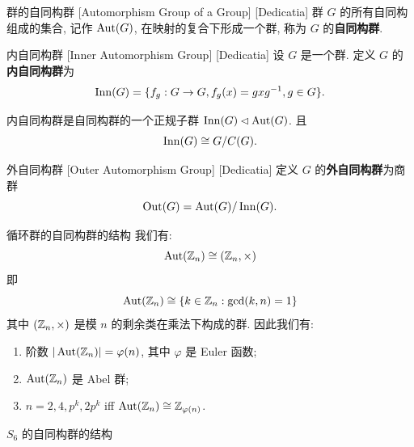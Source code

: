         \begin{dfn}
            [GroupAutomorphism]
            {群的自同构群}
            [Automorphism Group of a Group]
            [Dedicatia]
            群 \(G\) 的所有自同构组成的集合, 记作 \(\operatorname{Aut}(G)\), 在映射的复合下形成一个群, 称为 \(G\) 的\textbf{自同构群}.
        \end{dfn}

        \begin{dfn}
            [InnerAutomorphismGroup]
            {内自同构群}
            [Inner Automorphism Group]
            [Dedicatia]
            设 \(G\) 是一个群. 定义 \(G\) 的\textbf{内自同构群}为
            \[\operatorname{Inn}(G)=\{f_g: G\to G, f_g(x)=gxg^{-1}, g\in G\}.\]
        \end{dfn}

        \begin{ppt}
            {内自同构群是自同构群的一个正规子群}
            \(\operatorname{Inn}(G)\lhd\operatorname{Aut}(G)\). 且
            \[\operatorname{Inn}(G)\cong G/C(G). \]
        \end{ppt}

        \begin{dfn}
            [OuterAutomorphismGroup]
            {外自同构群}
            [Outer Automorphism Group]
            [Dedicatia]
            定义 \(G\) 的\textbf{外自同构群}为商群
            \[\operatorname{Out}(G)=\operatorname{Aut}(G)/\operatorname{Inn}(G).\]
        \end{dfn}

        \begin{xmp}
            {循环群的自同构群的结构}
            我们有:
            \[\operatorname{Aut}(\operatorname{\mathbb{Z}}_n)\cong(\operatorname{\mathbb{Z}}_n, \times)\]
            即
            \[\operatorname{Aut}(\operatorname{\mathbb{Z}}_n)\cong\{k\in\operatorname{\mathbb{Z}}_n: \gcd(k,n)=1\}\]
            其中 \((\operatorname{\mathbb{Z}}_n, \times)\) 是模 \(n\) 的剩余类在乘法下构成的群. 因此我们有:
            \begin{enumerate}[label=(\roman*)]
                \item 阶数 \(|\operatorname{Aut}(\operatorname{\mathbb{Z}}_n)|=\varphi(n)\), 其中 \(\varphi\) 是 Euler 函数;
                \item \(\operatorname{Aut}(\operatorname{\mathbb{Z}}_n)\) 是 Abel 群;
                \item \(n=2,4,p^k, 2p^k\) iff \(\operatorname{Aut}(\operatorname{\mathbb{Z}}_n)\cong\operatorname{\mathbb{Z}}_{\varphi(n)}\).
            \end{enumerate}
            
        \end{xmp}

        \begin{xmp}
            {\(S_6\) 的自同构群的结构}
        \end{xmp}

